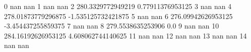 0 nan nan
1 nan nan
2 280.3329772949219 0.77911376953125
3 nan nan
4 278.01873779296875 -1.535125732421875
5 nan nan
6 276.09942626953125 -3.454437255859375
7 nan nan
8 279.5538635253906 0.0
9 nan nan
10 284.16192626953125 4.608062744140625
11 nan nan
12 nan nan
13 nan nan
14 nan nan
